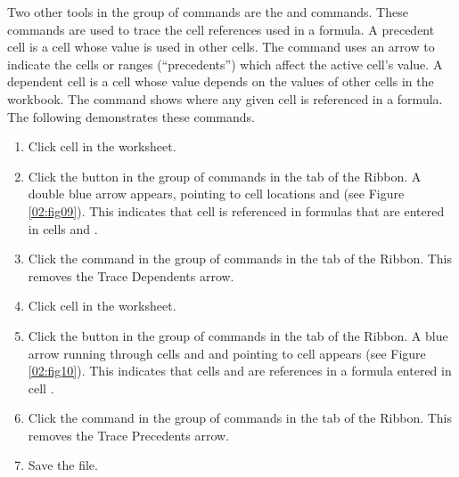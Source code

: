 Two other tools in the  group of commands are the  and  commands. These commands are used to trace the cell references used in a formula. A precedent cell is a cell whose value is used in other cells. The  command uses an arrow to indicate the cells or ranges (``precedents'') which affect the active cell's value. A dependent cell is a cell whose value depends on the values of other cells in the workbook. The  command shows where any given cell is referenced in a formula. The following demonstrates these commands.

\begin{enumerate}
	\item Click cell  in the  worksheet.
	\item Click the  button in the  group of commands in the  tab of the Ribbon. A double blue arrow appears, pointing to cell locations  and  (see Figure \ref{02:fig09}). This indicates that cell  is referenced in formulas that are entered in cells  and .
	\item Click the  command in the  group of commands in the  tab of the Ribbon. This removes the Trace Dependents arrow.
	\item Click cell  in the  worksheet.
	\item Click the  button in the  group of commands in the  tab of the Ribbon. A blue arrow running through cells  and  and pointing to cell  appears (see Figure \ref{02:fig10}). This indicates that cells  and  are references in a formula entered in cell .
	\item Click the  command in the  group of commands in the  tab of the Ribbon. This removes the Trace Precedents arrow.
	\item Save the  file.
\end{enumerate}

